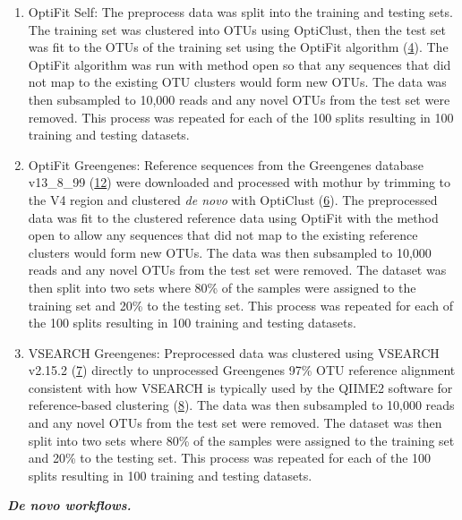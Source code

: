 \documentclass[
]{article}
\providecommand{\tightlist}{%
  \setlength{\itemsep}{0pt}\setlength{\parskip}{0pt}}
\begin{document}
\begin{enumerate}
\def\labelenumi{\arabic{enumi}.}
\tightlist
\item
  OptiFit Self: The preprocess data was split into the training and
  testing sets. The training set was clustered into OTUs using
  OptiClust, then the test set was fit to the OTUs of the training set
  using the OptiFit algorithm (\protect\hyperlink{ref-sovacool2022}{4}).
  The OptiFit algorithm was run with method open so that any sequences
  that did not map to the existing OTU clusters would form new OTUs. The
  data was then subsampled to 10,000 reads and any novel OTUs from the
  test set were removed. This process was repeated for each of the 100
  splits resulting in 100 training and testing datasets.
\item
  OptiFit Greengenes: Reference sequences from the Greengenes database
  v13\_8\_99 (\protect\hyperlink{ref-desantis2006}{12}) were downloaded
  and processed with mothur by trimming to the V4 region and clustered
  \emph{de novo} with OptiClust
  (\protect\hyperlink{ref-westcott2017}{6}). The preprocessed data was
  fit to the clustered reference data using OptiFit with the method open
  to allow any sequences that did not map to the existing reference
  clusters would form new OTUs. The data was then subsampled to 10,000
  reads and any novel OTUs from the test set were removed. The dataset
  was then split into two sets where 80\% of the samples were assigned
  to the training set and 20\% to the testing set. This process was
  repeated for each of the 100 splits resulting in 100 training and
  testing datasets.
\item
  VSEARCH Greengenes: Preprocessed data was clustered using VSEARCH
  v2.15.2 (\protect\hyperlink{ref-rognes2016}{7}) directly to
  unprocessed Greengenes 97\% OTU reference alignment consistent with
  how VSEARCH is typically used by the QIIME2 software for
  reference-based clustering (\protect\hyperlink{ref-bolyen2019}{8}).
  The data was then subsampled to 10,000 reads and any novel OTUs from
  the test set were removed. The dataset was then split into two sets
  where 80\% of the samples were assigned to the training set and 20\%
  to the testing set. This process was repeated for each of the 100
  splits resulting in 100 training and testing datasets.
\end{enumerate}

\textbf{\emph{De novo workflows.}}
\end{document}
